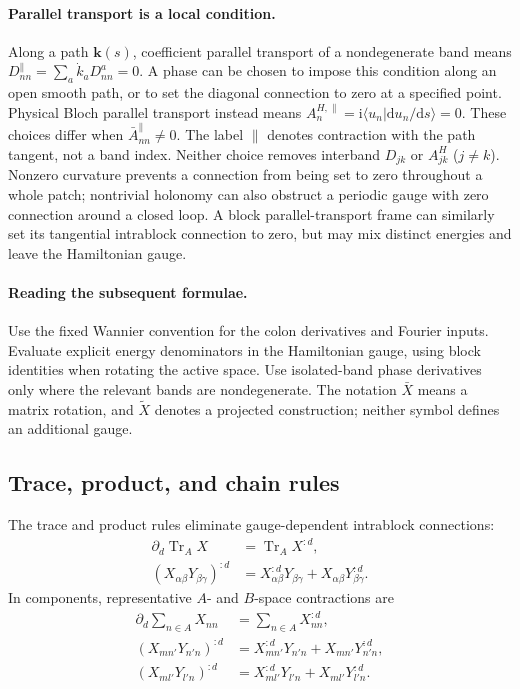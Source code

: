 \documentclass[prx,amsmath,amssymb,superscriptaddress,longbibliography]{revtex4-2}
\newcommand{\Tr}{\operatorname{Tr}}
\newcommand{\dd}{\mathrm{d}}
\newcommand{\ii}{\mathrm{i}}
\begin{document}
\paragraph{Parallel transport is a local condition.}
Along a path $\bm k(s)$, coefficient parallel transport of a nondegenerate
band means $D_{nn}^{\parallel}=\sum_a\dot k_aD_{nn}^a=0$.
A phase can be chosen to impose this condition along an open smooth path,
or to set the diagonal connection to zero at a specified point.
Physical Bloch parallel transport instead means
$A_n^{H,\parallel}=\ii\langle u_n|\dd u_n/\dd s\rangle=0$.
These choices differ when $\bar A_{nn}^{\parallel}\ne0$.
The label $\parallel$ denotes contraction with the path tangent, not a band index.
Neither choice removes interband $D_{jk}$ or $A_{jk}^H$ ($j\ne k$).
Nonzero curvature prevents a connection from being set to zero throughout a
whole patch; nontrivial holonomy can also obstruct a periodic gauge with
zero connection around a closed loop.
A block parallel-transport frame can similarly set its tangential intrablock
connection to zero, but may mix distinct energies and leave the Hamiltonian gauge.

\paragraph{Reading the subsequent formulae.}
Use the fixed Wannier convention for the colon derivatives and Fourier inputs.
Evaluate explicit energy denominators in the Hamiltonian gauge, using block
identities when rotating the active space.
Use isolated-band phase derivatives only where the relevant bands are nondegenerate.
The notation $\bar X$ means a matrix rotation, and $\widetilde X$ denotes a
projected construction; neither symbol defines an additional gauge.

\subsection{Trace, product, and chain rules}
The trace and product rules eliminate gauge-dependent intrablock connections:
\begin{align}
 \partial_d\Tr_A X&=\Tr_A X^{:d},
 \label{eq:trace}\\
 (X_{\alpha\beta}Y_{\beta\gamma})^{:d}&=X_{\alpha\beta}^{:d}Y_{\beta\gamma}+X_{\alpha\beta}Y_{\beta\gamma}^{:d}.
 \label{eq:product}
\end{align}
In components, representative $A$- and $B$-space contractions are
\begin{align}
 \partial_d\sum_{n\in A}X_{nn}&=\sum_{n\in A}X_{nn}^{:d},\nonumber\\
 (X_{mn'}Y_{n'n})^{:d}&=X_{mn'}^{:d}Y_{n'n}+X_{mn'}Y_{n'n}^{:d},\nonumber\\
 (X_{ml'}Y_{l'n})^{:d}&=X_{ml'}^{:d}Y_{l'n}+X_{ml'}Y_{l'n}^{:d}.
 \label{eq:product-components}
\end{align}
\end{document}
